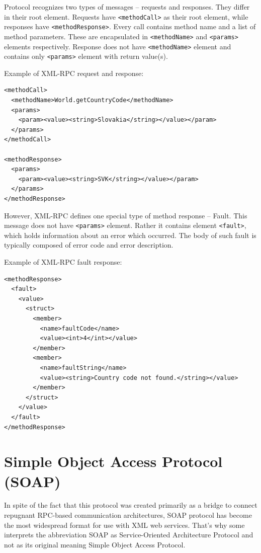 \documentclass[12pt,notitlepage]{report}
\begin{document}
Protocol recognizes two types of messages -- requests and responses. They differ in their root element. Requests have \texttt{<methodCall>} as their root element, while responses have \texttt{<methodResponse>}. Every call contains method name and a list of method parameters. These are encapsulated in \texttt{<methodName>} and \texttt{<params>} elements respectively. Response does not have \texttt{<methodName>} element and contains only \texttt{<params>} element with return value(s).

Example of XML-RPC request and response:

\begin{small}
\begin{verbatim}
<methodCall>
  <methodName>World.getCountryCode</methodName>
  <params>
    <param><value><string>Slovakia</string></value></param>
  </params>
</methodCall>

<methodResponse>
  <params>
    <param><value><string>SVK</string></value></param>
  </params>
</methodResponse>
\end{verbatim}
\end{small}

However, XML-RPC defines one special type of method response -- Fault. This message does not have  \texttt{<params>} element. Rather it contains element \texttt{<fault>}, which holds information about an error which occurred. The body of such fault is typically composed of error code and error description. 

Example of XML-RPC fault response:

\begin{small}
\begin{verbatim}
<methodResponse>
  <fault>
    <value>
      <struct>
        <member>
          <name>faultCode</name>
          <value><int>4</int></value>
        </member>
        <member>
          <name>faultString</name>
          <value><string>Country code not found.</string></value>
        </member>
      </struct>
    </value>
  </fault>
</methodResponse>
\end{verbatim}
\end{small}

\section{Simple Object Access Protocol (SOAP)}
\label{soap}
In spite of the fact that this protocol was created primarily as a bridge to connect repugnant RPC-based communication architectures, SOAP protocol has become the most widespread format for use with XML web services. That's why some interprets the abbreviation SOAP as Service-Oriented Architecture Protocol and not as its original meaning Simple Object Access Protocol.
\end{document}
